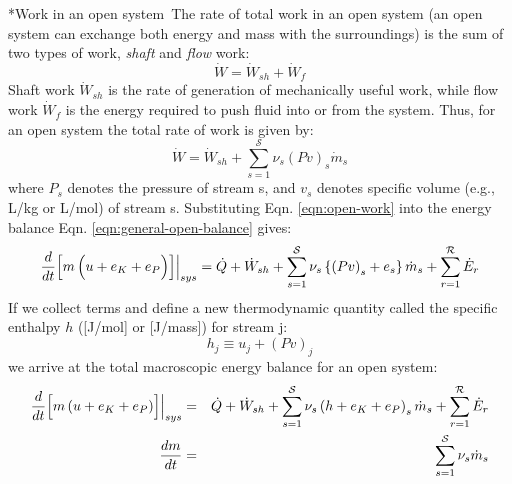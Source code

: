 \documentclass[11pt]{article}
\makeatletter
\theoremstyle{definition}
\renewcommand\paragraph{\@startsection
	{paragraph}{2}{0mm}
	{-0.05in}
	{-0.5\baselineskip}
	{\normalfont\normalsize\itshape}}
\makeatother
\begin{document}
\paragraph*{Work in an open system}~The rate of total work in an open system (an open system can exchange both energy and mass with the surroundings) is the sum of two types of work, \emph{shaft} and \emph{flow} work:
\begin{equation}
	\dot{W} = \dot{W}_{sh} + \dot{W}_{f}
\end{equation}
Shaft work $\dot{W}_{sh}$ is the rate of generation of mechanically useful work, while flow work $\dot{W}_{f}$ is the energy required to push fluid into or from the system.
Thus, for an open system the total rate of work is given by:
\begin{equation}\label{eqn:open-work}
	\dot{W} = \dot{W}_{sh} + \sum_{s=1}^{\mathcal{S}}\nu_{s}\left(Pv\right)_{s}\dot{m}_{s}
\end{equation}where $P_{s}$ denotes the pressure of stream s, and $v_{s}$ denotes specific volume (e.g., L/kg or L/mol) of stream s.
Substituting Eqn. \eqref{eqn:open-work} into the energy balance Eqn. \eqref{eqn:general-open-balance} gives:
\begin{equation}
	\frac{d}{dt}\Bigl[m\left(u+e_{K}+e_{P}\Bigl)\right]\Bigr|_{sys} = \dot{Q}+\dot{W}_{sh} + \sum_{s=1}^{\mathcal{S}}\nu_{s}\left\{\left(Pv\right)_{s}+e_{s}\right\}\dot{m}_{s}+ \sum_{r=1}^{\mathcal{R}}\dot{E}_{r}
\end{equation}If we collect terms and define a new thermodynamic quantity called the specific enthalpy $h$ ([J/mol] or [J/mass]) for stream j:
\begin{equation}
	h_{j} \equiv u_{j} + \left(Pv\right)_{j}
\end{equation}we arrive at the total macroscopic energy balance for an open system:
\begin{eqnarray}
	\frac{d}{dt}\Bigl[m\left(u+e_{K}+e_{P}\right)\Bigr]\Bigr|_{sys} &=& \dot{Q}+\dot{W}_{sh} + \sum_{s=1}^{\mathcal{S}}\nu_{s}\left(h+e_{K}+e_{P}\right)_{s}\dot{m}_{s} + \sum_{r=1}^{\mathcal{R}}\dot{E}_{r}\\
	\frac{dm}{dt} &=& \sum_{s=1}^{\mathcal{S}}\nu_{s}\dot{m}_{s}
\end{eqnarray}
\end{document}
